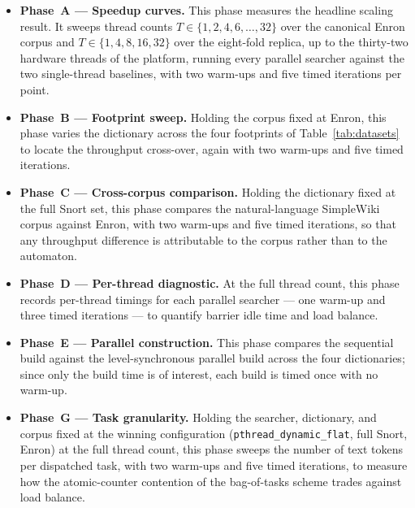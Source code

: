 \begin{itemize}
    \item \textbf{Phase~A --- Speedup curves.} This phase measures the headline
    scaling result. It sweeps thread counts $T \in \{1,2,4,6,\dots,32\}$ over the
    canonical Enron corpus and $T \in \{1,4,8,16,32\}$ over the eight-fold
    replica, up to the thirty-two hardware threads of the platform, running every
    parallel searcher against the two single-thread baselines, with two warm-ups
    and five timed iterations per point.

    \item \textbf{Phase~B --- Footprint sweep.} Holding the corpus fixed at
    Enron, this phase varies the dictionary across the four footprints of
    Table~\ref{tab:datasets} to locate the throughput cross-over, again with two
    warm-ups and five timed iterations.

    \item \textbf{Phase~C --- Cross-corpus comparison.} Holding the dictionary
    fixed at the full Snort set, this phase compares the natural-language
    SimpleWiki corpus against Enron, with two warm-ups and five timed iterations,
    so that any throughput difference is attributable to the corpus rather than
    to the automaton.

    \item \textbf{Phase~D --- Per-thread diagnostic.} At the full thread count,
    this phase records per-thread timings for each parallel searcher --- one
    warm-up and three timed iterations --- to quantify barrier idle time and load
    balance.

    \item \textbf{Phase~E --- Parallel construction.} This phase compares the
    sequential build against the level-synchronous parallel build across the four
    dictionaries; since only the build time is of interest, each build is timed
    once with no warm-up.

    \item \textbf{Phase~G --- Task granularity.} Holding the searcher,
    dictionary, and corpus fixed at the winning configuration
    (\texttt{pthread\_dynamic\_flat}, full Snort, Enron) at the full thread
    count, this phase sweeps the number of text tokens per dispatched task, with
    two warm-ups and five timed iterations, to measure how the atomic-counter
    contention of the bag-of-tasks scheme trades against load balance.
\end{itemize}

